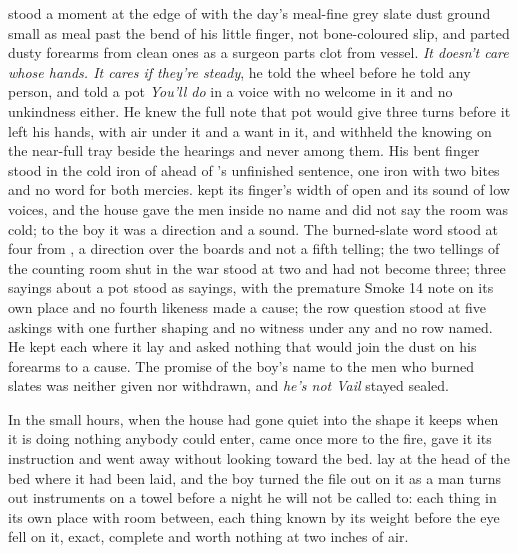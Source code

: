  stood a moment at the edge of  with the day's meal-fine grey slate dust ground small as meal past the bend of his little finger, not bone-coloured slip, and parted dusty forearms from clean ones as a surgeon parts clot from vessel. \emph{It doesn't care whose hands. It cares if they're steady}, he told the wheel before he told any person, and told a pot \emph{You'll do} in a voice with no welcome in it and no unkindness either. He knew the full note that pot would give three turns before it left his hands, with air under it and a want in it, and withheld the knowing on the near-full tray beside the hearings and never among them. His bent finger stood in the cold iron of  ahead of 's unfinished sentence, one iron with two bites and no  word for both mercies.  kept its finger's width of open and its sound of low voices, and the house gave the men inside no name and did not say the room was cold; to the boy it was a direction and a sound. The burned-slate word stood at four from , a direction over the boards and not a fifth telling; the two tellings of the counting room shut in the war stood at two and had not become three; three sayings about a pot stood as sayings, with the premature Smoke 14 note on its own place and no fourth likeness made a cause; the row question stood at five askings with one further shaping and no witness under any and no row named. He kept each where it lay and asked nothing that would join the dust on his forearms to a cause. The promise of the boy's name to the men who burned slates was neither given nor withdrawn, and \emph{he's not Vail} stayed sealed.

\scenebreak

In the small hours, when the house had gone quiet into the shape it keeps when it is doing nothing anybody could enter,  came once more to the fire, gave it its instruction and went away without looking toward the bed.  lay at the head of the bed where it had been laid, and the boy turned the file out on it as a man turns out instruments on a towel before a night he will not be called to: each thing in its own place with room between, each thing known by its weight before the eye fell on it, exact, complete and worth nothing at two inches of air.

